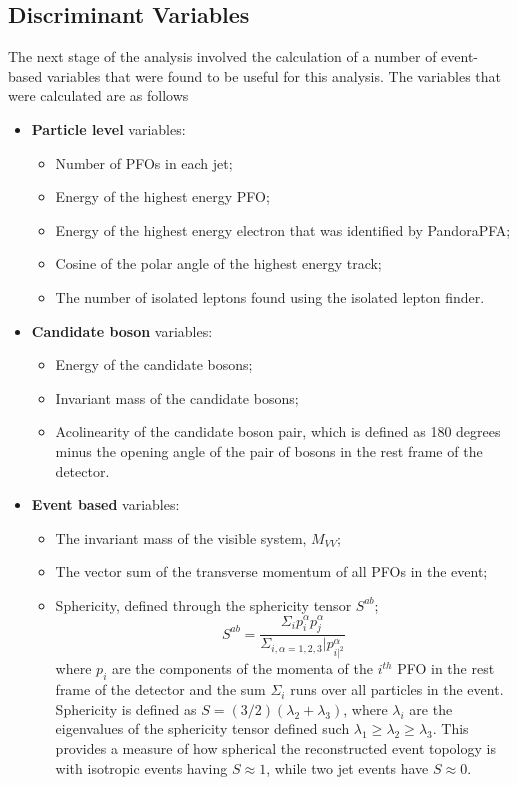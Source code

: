 \subsection{Discriminant Variables} 
\label{sec:analysisprocessor}
The next stage of the analysis involved the calculation of a number of event-based variables that were found to be useful for this analysis.  The variables that were calculated are as follows
%
\begin{itemize}
\item \textbf{Particle level} variables:

\begin{itemize}
\item Number of PFOs in each jet;
\item Energy of the highest energy PFO;
\item Energy of the highest energy electron that was identified by PandoraPFA;
\item Cosine of the polar angle of the highest energy track;
\item The number of isolated leptons found using the isolated lepton finder.
\end{itemize}

\item \textbf{Candidate boson} variables:
\begin{itemize}
\item Energy of the candidate bosons;
\item Invariant mass of the candidate bosons;
\item Acolinearity of the candidate boson pair, which is defined as 180 degrees minus the opening angle of the pair of bosons in the rest frame of the detector.
\end{itemize}

\item \textbf{Event based} variables:  
\begin{itemize}
\item The invariant mass of the visible system, $M_{VV}$;
\item The vector sum of the transverse momentum of all PFOs in the event;
\item Sphericity, defined through the sphericity tensor $S^{ab}$;
\begin{equation}
S^{ab} = \frac{\Sigma_{i}p^{\alpha}_{i}p^{\alpha}_{j}}{\Sigma_{i,\alpha=1,2,3}|p^{\alpha}_{i|^{2}}}
\end{equation}
where $p_{i}$ are the components of the momenta of the $i^{th}$ PFO in the rest frame of the detector and the sum $\Sigma_{i}$ runs over all particles in the event.  Sphericity is defined as $S = (3/2)(\lambda_{2} + \lambda_{3})$, where $\lambda_{i}$ are the eigenvalues of the sphericity tensor defined such $\lambda_{1} \geq \lambda_{2} \geq \lambda_{3}$.  This provides a measure of how spherical the reconstructed event topology is with isotropic events having $S \approx 1$, while two jet events have $S \approx 0$.
\end{itemize}


\end{itemize}
